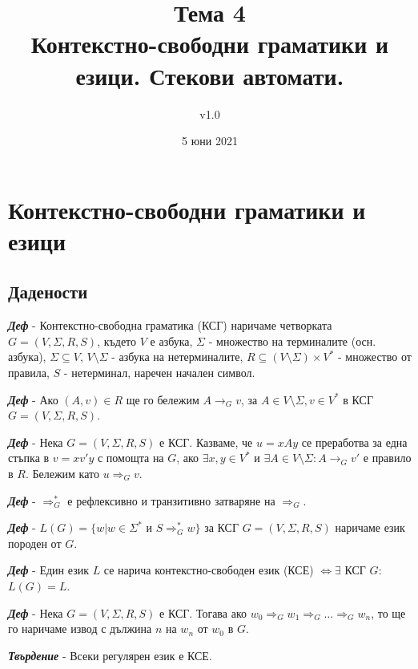 \documentclass[fleqn,12pt]{article}
\title{Тема 4\\ Контекстно-свободни граматики и езици. Стекови автомати.}
\author{v1.0}
\date{5 юни 2021}
\begin{document}
\maketitle

\tableofcontents
\pagebreak

\section{Контекстно-свободни граматики и езици}
\subsection{Дадености}

\noindent\textit{\textbf{Деф}} - Контекстно-свободна граматика (КСГ) наричаме четворката $G = (V, \Sigma, R, S)$, където $V$ е азбука, $\Sigma$ - множество на терминалите (осн. азбука), $\Sigma \subseteq V$, $V \setminus \Sigma$ - азбука на нетерминалите, $R \subseteq (V \setminus \Sigma) \times V^*$ - множество от правила, $S$ - нетерминал, наречен начален символ.

\noindent\textit{\textbf{Деф}} - Ако $(A, v) \in R$ ще го бележим $A \to_G v$, за $A \in V \setminus \Sigma, v \in V^*$ в КСГ $G=(V, \Sigma, R, S)$.

\noindent\textit{\textbf{Деф}} - Нека $G = (V, \Sigma, R, S)$ е КСГ. Казваме, че $u = xAy$ се преработва за една стъпка в $v = xv'y$ с помощта на $G$, ако $\exists x, y \in V^*$ и $\exists A \in V \setminus \Sigma: A \to_G v'$ е правило в $R$. Бележим като $u \Rightarrow_G v$.

\noindent\textit{\textbf{Деф}} - $\Rightarrow_G^*$ е рефлексивно и транзитивно затваряне на $\Rightarrow_G$.

\noindent\textit{\textbf{Деф}} - $L(G) = \{w | w \in \Sigma^*$ и $ S \Rightarrow_G^* w\}$ за КСГ $G = (V, \Sigma, R, S)$ наричаме език породен от $G$.

\noindent\textit{\textbf{Деф}} - Един език $L$ се нарича контекстно-свободен език (КСЕ) $\iff \exists$ КСГ $G$: $L(G) = L$.

\noindent\textit{\textbf{Деф}} - Нека $G = (V, \Sigma, R, S)$ е КСГ. Тогава ако $w_0 \Rightarrow_G w_1 \Rightarrow_G \dots \Rightarrow_G w_n$, то ще го наричаме извод с дължина $n$ на $w_n$ от $w_0$ в $G$.

\noindent\textit{\textbf{Твърдение}} - Всеки регулярен език е КСЕ. 
\end{document}
